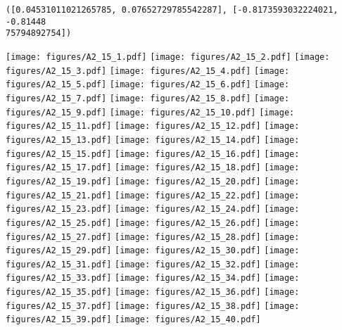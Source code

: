 \documentclass[12pt,a4paper]{article}
\begin{document}
\begin{lstlisting}
([0.04531011021265785, 0.07652729785542287], [-0.8173593032224021, -0.81448
75794892754])
\end{lstlisting}

\texttt{[image: figures/A2\_15\_1.pdf]}
\texttt{[image: figures/A2\_15\_2.pdf]}
\texttt{[image: figures/A2\_15\_3.pdf]}
\texttt{[image: figures/A2\_15\_4.pdf]}
\texttt{[image: figures/A2\_15\_5.pdf]}
\texttt{[image: figures/A2\_15\_6.pdf]}
\texttt{[image: figures/A2\_15\_7.pdf]}
\texttt{[image: figures/A2\_15\_8.pdf]}
\texttt{[image: figures/A2\_15\_9.pdf]}
\texttt{[image: figures/A2\_15\_10.pdf]}
\texttt{[image: figures/A2\_15\_11.pdf]}
\texttt{[image: figures/A2\_15\_12.pdf]}
\texttt{[image: figures/A2\_15\_13.pdf]}
\texttt{[image: figures/A2\_15\_14.pdf]}
\texttt{[image: figures/A2\_15\_15.pdf]}
\texttt{[image: figures/A2\_15\_16.pdf]}
\texttt{[image: figures/A2\_15\_17.pdf]}
\texttt{[image: figures/A2\_15\_18.pdf]}
\texttt{[image: figures/A2\_15\_19.pdf]}
\texttt{[image: figures/A2\_15\_20.pdf]}
\texttt{[image: figures/A2\_15\_21.pdf]}
\texttt{[image: figures/A2\_15\_22.pdf]}
\texttt{[image: figures/A2\_15\_23.pdf]}
\texttt{[image: figures/A2\_15\_24.pdf]}
\texttt{[image: figures/A2\_15\_25.pdf]}
\texttt{[image: figures/A2\_15\_26.pdf]}
\texttt{[image: figures/A2\_15\_27.pdf]}
\texttt{[image: figures/A2\_15\_28.pdf]}
\texttt{[image: figures/A2\_15\_29.pdf]}
\texttt{[image: figures/A2\_15\_30.pdf]}
\texttt{[image: figures/A2\_15\_31.pdf]}
\texttt{[image: figures/A2\_15\_32.pdf]}
\texttt{[image: figures/A2\_15\_33.pdf]}
\texttt{[image: figures/A2\_15\_34.pdf]}
\texttt{[image: figures/A2\_15\_35.pdf]}
\texttt{[image: figures/A2\_15\_36.pdf]}
\texttt{[image: figures/A2\_15\_37.pdf]}
\texttt{[image: figures/A2\_15\_38.pdf]}
\texttt{[image: figures/A2\_15\_39.pdf]}
\texttt{[image: figures/A2\_15\_40.pdf]}
\end{document}
